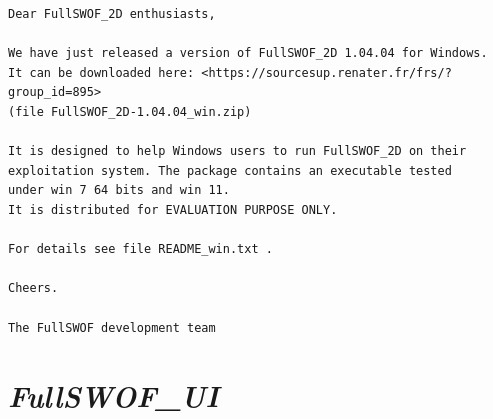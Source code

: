 \documentclass[a4paper, 11pt]{article}
\newcommand{\FullSWOFUI}{\emph{FullSWOF\_UI}}
\begin{document}
\begin{enumerate}
\begin{verbatim}
Dear FullSWOF_2D enthusiasts,

We have just released a version of FullSWOF_2D 1.04.04 for Windows.
It can be downloaded here: <https://sourcesup.renater.fr/frs/?group_id=895>
(file FullSWOF_2D-1.04.04_win.zip)

It is designed to help Windows users to run FullSWOF_2D on their 
exploitation system. The package contains an executable tested
under win 7 64 bits and win 11.
It is distributed for EVALUATION PURPOSE ONLY.

For details see file README_win.txt .

Cheers.

The FullSWOF development team 
\end{verbatim}
\end{enumerate}


\section{\FullSWOFUI{}}
\end{document}
